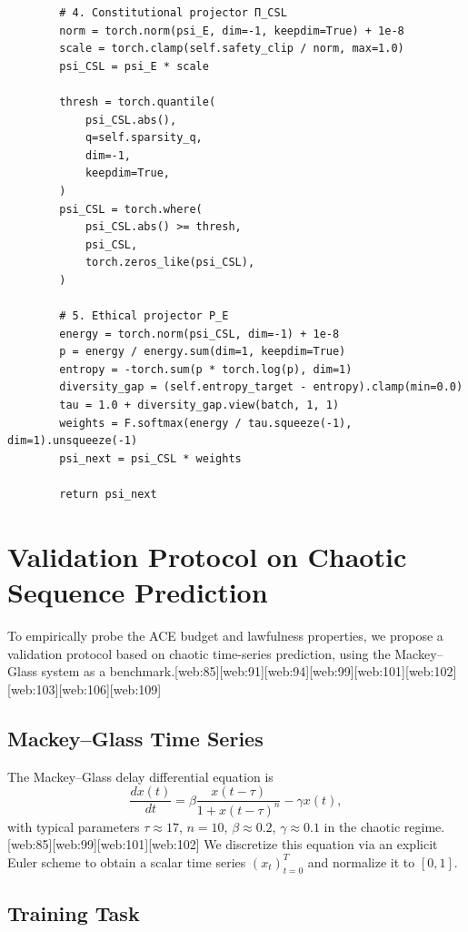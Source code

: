 \documentclass[11pt]{article}
\theoremstyle{definition}
\theoremstyle{plain}
\begin{document}
\begin{verbatim}
        # 4. Constitutional projector Π_CSL
        norm = torch.norm(psi_E, dim=-1, keepdim=True) + 1e-8
        scale = torch.clamp(self.safety_clip / norm, max=1.0)
        psi_CSL = psi_E * scale

        thresh = torch.quantile(
            psi_CSL.abs(),
            q=self.sparsity_q,
            dim=-1,
            keepdim=True,
        )
        psi_CSL = torch.where(
            psi_CSL.abs() >= thresh,
            psi_CSL,
            torch.zeros_like(psi_CSL),
        )

        # 5. Ethical projector P_E
        energy = torch.norm(psi_CSL, dim=-1) + 1e-8
        p = energy / energy.sum(dim=1, keepdim=True)
        entropy = -torch.sum(p * torch.log(p), dim=1)
        diversity_gap = (self.entropy_target - entropy).clamp(min=0.0)
        tau = 1.0 + diversity_gap.view(batch, 1, 1)
        weights = F.softmax(energy / tau.squeeze(-1), dim=1).unsqueeze(-1)
        psi_next = psi_CSL * weights

        return psi_next
\end{verbatim}

\section{Validation Protocol on Chaotic Sequence Prediction}

To empirically probe the ACE budget and lawfulness properties, we propose a validation protocol based on chaotic time-series prediction, using the Mackey--Glass system as a benchmark.[web:85][web:91][web:94][web:99][web:101][web:102][web:103][web:106][web:109]

\subsection{Mackey--Glass Time Series}

The Mackey--Glass delay differential equation is
\[
  \frac{dx(t)}{dt} = \beta \frac{x(t-\tau)}{1 + x(t-\tau)^n} - \gamma x(t),
\]
with typical parameters $\tau \approx 17$, $n = 10$, $\beta \approx 0.2$, $\gamma \approx 0.1$ in the chaotic regime.[web:85][web:99][web:101][web:102]
We discretize this equation via an explicit Euler scheme to obtain a scalar time series $(x_t)_{t=0}^{T}$ and normalize it to $[0,1]$.

\subsection{Training Task}
\end{document}
